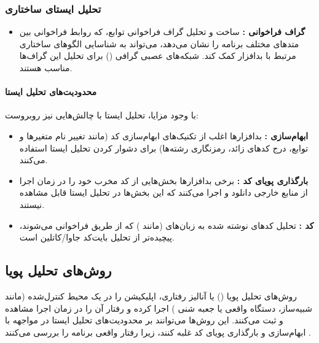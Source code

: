 \subsubsection{تحلیل ایستای ساختاری}
\begin{itemize}
    \item \textbf{گراف فراخوانی :} ساخت و تحلیل گراف فراخوانی توابع، که روابط فراخوانی بین متدهای مختلف برنامه را نشان می‌دهد، می‌تواند به شناسایی الگوهای ساختاری مرتبط با بدافزار کمک کند. شبکه‌های عصبی گرافی () برای تحلیل این گراف‌ها مناسب هستند.
\end{itemize}

\paragraph{محدودیت‌های تحلیل ایستا}
با وجود مزایا، تحلیل ایستا با چالش‌هایی نیز روبروست:
\begin{itemize}
    \item \textbf{ابهام‌سازی :} بدافزارها اغلب از تکنیک‌های ابهام‌سازی کد (مانند تغییر نام متغیرها و توابع، درج کدهای زائد، رمزنگاری رشته‌ها) برای دشوار کردن تحلیل ایستا استفاده می‌کنند.
    \item \textbf{بارگذاری پویای کد :} برخی بدافزارها بخش‌هایی از کد مخرب خود را در زمان اجرا از منابع خارجی دانلود و اجرا می‌کنند که این بخش‌ها در تحلیل ایستا قابل مشاهده نیستند.
    \item \textbf{کد :} تحلیل کدهای نوشته شده به زبان‌های  (مانند ) که از طریق  فراخوانی می‌شوند، پیچیده‌تر از تحلیل بایت‌کد جاوا/کاتلین است.
\end{itemize}

\subsection{روش‌های تحلیل پویا}
روش‌های تحلیل پویا () یا آنالیز رفتاری، اپلیکیشن را در یک محیط کنترل‌شده (مانند شبیه‌ساز، دستگاه واقعی یا جعبه شنی ) اجرا کرده و رفتار آن را در زمان اجرا مشاهده و ثبت می‌کنند. این روش‌ها می‌توانند بر محدودیت‌های تحلیل ایستا در مواجهه با ابهام‌سازی و بارگذاری پویای کد غلبه کنند، زیرا رفتار واقعی برنامه را بررسی می‌کنند \cite{AndroidMalwareSurvey}.


